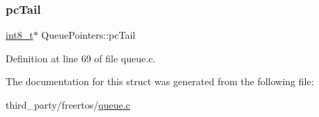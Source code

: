 \subsubsection{\texorpdfstring{pc\+Tail}{pcTail}}
{\footnotesize\ttfamily \hyperlink{stdint_8h_aef44329758059c91c76d334e8fc09700}{int8\+\_\+t}$\ast$ Queue\+Pointers\+::pc\+Tail}



Definition at line 69 of file queue.\+c.



The documentation for this struct was generated from the following file\+:\begin{DoxyCompactItemize}
\item 
third\+\_\+party/freertos/\hyperlink{queue_8c}{queue.\+c}\end{DoxyCompactItemize}
